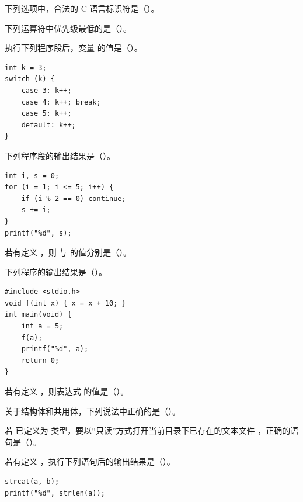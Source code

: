 \documentclass[a4paper,11pt]{article}
\begin{document}


\begin{qgroup}
\q 下列选项中，合法的 C 语言标识符是（\quad）。

\q 下列运算符中优先级最低的是（\quad）。

\q 执行下列程序段后，变量  的值是（\quad）。
\begin{lstlisting}[language={[custom]C}]
int k = 3;
switch (k) {
    case 3: k++;
    case 4: k++; break;
    case 5: k++;
    default: k++;
}
\end{lstlisting}

\q 下列程序段的输出结果是（\quad）。
\begin{lstlisting}[language={[custom]C}]
int i, s = 0;
for (i = 1; i <= 5; i++) {
    if (i % 2 == 0) continue;
    s += i;
}
printf("%d", s);
\end{lstlisting}

\q 若有定义 ，则  与  的值分别是（\quad）。

\q 下列程序的输出结果是（\quad）。
\begin{lstlisting}[language={[custom]C}]
#include <stdio.h>
void f(int x) { x = x + 10; }
int main(void) {
    int a = 5;
    f(a);
    printf("%d", a);
    return 0;
}
\end{lstlisting}

\q 若有定义 ，则表达式  的值是（\quad）。

\q 关于结构体和共用体，下列说法中正确的是（\quad）。

\q 若  已定义为  类型，要以“只读”方式打开当前目录下已存在的文本文件 ，正确的语句是（\quad）。

\q 若有定义 ，执行下列语句后的输出结果是（\quad）。
\begin{lstlisting}[language={[custom]C}]
strcat(a, b);
printf("%d", strlen(a));
\end{lstlisting}
\end{qgroup}
\end{document}
